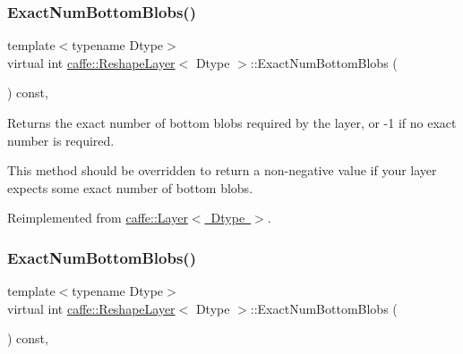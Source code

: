 \subsubsection{\texorpdfstring{Exact\+Num\+Bottom\+Blobs()}{ExactNumBottomBlobs()}\hspace{0.1cm}{\footnotesize\ttfamily [1/2]}}
{\footnotesize\ttfamily template$<$typename Dtype$>$ \\
virtual int \mbox{\hyperlink{classcaffe_1_1_reshape_layer}{caffe\+::\+Reshape\+Layer}}$<$ Dtype $>$\+::Exact\+Num\+Bottom\+Blobs (\begin{DoxyParamCaption}{ }\end{DoxyParamCaption}) const\hspace{0.3cm}{\ttfamily [inline]}, {\ttfamily [virtual]}}



Returns the exact number of bottom blobs required by the layer, or -\/1 if no exact number is required. 

This method should be overridden to return a non-\/negative value if your layer expects some exact number of bottom blobs. 

Reimplemented from \mbox{\hyperlink{classcaffe_1_1_layer_a8e5ee0494d85f5f55fc4396537cbc60f}{caffe\+::\+Layer$<$ Dtype $>$}}.

\mbox{\label{classcaffe_1_1_reshape_layer_ad97ea6043b01351e85b39b512ae0e489}} 
\subsubsection{\texorpdfstring{Exact\+Num\+Bottom\+Blobs()}{ExactNumBottomBlobs()}\hspace{0.1cm}{\footnotesize\ttfamily [2/2]}}
{\footnotesize\ttfamily template$<$typename Dtype$>$ \\
virtual int \mbox{\hyperlink{classcaffe_1_1_reshape_layer}{caffe\+::\+Reshape\+Layer}}$<$ Dtype $>$\+::Exact\+Num\+Bottom\+Blobs (\begin{DoxyParamCaption}{ }\end{DoxyParamCaption}) const\hspace{0.3cm}{\ttfamily [inline]}, {\ttfamily [virtual]}}



